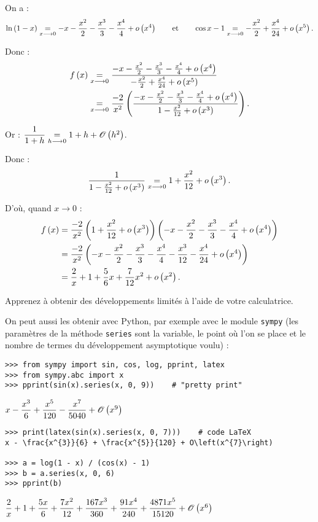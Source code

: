 \begin{corr}
On a : \[\ln\left(1-x\right)\underset{x\longrightarrow0}{=}-x-\dfrac{x^2}{2}-\dfrac{x^3}{3}-\dfrac{x^4}{4}+o\left(x^4\right)\qquad\text{et}\qquad\cos x-1\underset{x\longrightarrow0}{=}-\dfrac{x^2}{2}+\dfrac{x^4}{24}+o\left(x^5\right).\]

Donc : \[\begin{aligned}
f\left(x\right)&\underset{x\longrightarrow0}{=}\dfrac{-x-\frac{x^2}{2}-\frac{x^3}{3}-\frac{x^4}{4}+o\left(x^4\right)}{-\frac{x^2}{2}+\frac{x^4}{24}+o\left(x^5\right)} \\
&\underset{x\longrightarrow0}{=}\dfrac{-2}{x^2}\left(\dfrac{-x-\frac{x^2}{2}-\frac{x^3}{3}-\frac{x^4}{4}+o\left(x^4\right)}{1-\frac{x^2}{12}+o\left(x^3\right)}\right).
\end{aligned}\]

Or : \(\dfrac{1}{1+h}\underset{h\longrightarrow0}{=}1+h+\mathscr{O}\left(h^2\right)\).

Donc : \[\dfrac{1}{1-\frac{x^2}{12}+o\left(x^3\right)}\underset{x\longrightarrow0}{=}1+\dfrac{x^2}{12}+o\left(x^3\right).\]

D'où, quand \(x\to0\) : \[\begin{aligned}
f\left(x\right)&=\dfrac{-2}{x^2}\left(1+\dfrac{x^2}{12}+o\left(x^3\right)\right)\left(-x-\dfrac{x^2}{2}-\dfrac{x^3}{3}-\dfrac{x^4}{4}+o\left(x^4\right)\right) \\
&=\dfrac{-2}{x^2}\left(-x-\dfrac{x^2}{2}-\dfrac{x^3}{3}-\dfrac{x^4}{4}-\dfrac{x^3}{12}-\dfrac{x^4}{24}+o\left(x^4\right)\right) \\
&=\dfrac{2}{x}+1+\dfrac{5}{6}x+\dfrac{7}{12}x^2+o\left(x^2\right).
\end{aligned}\]
\end{corr}

\begin{rem}
Apprenez à obtenir des développements limités à l'aide de votre calculatrice.

On peut aussi les obtenir avec Python, par exemple avec le module \verb|sympy| (les paramètres de la méthode \verb|series| sont la variable, le point où l'on se place et le nombre de termes du développement asymptotique voulu) :

\begin{verbatim}
>>> from sympy import sin, cos, log, pprint, latex
>>> from sympy.abc import x
>>> pprint(sin(x).series(x, 0, 9))    # "pretty print"
\end{verbatim}

\(x-\dfrac{x^3}{6}+\dfrac{x^5}{120}-\dfrac{x^7}{5040}+\mathscr{O}\left(x^9\right)\)

\begin{verbatim}
>>> print(latex(sin(x).series(x, 0, 7)))    # code LaTeX
x - \frac{x^{3}}{6} + \frac{x^{5}}{120} + O\left(x^{7}\right)

>>> a = log(1 - x) / (cos(x) - 1)
>>> b = a.series(x, 0, 6)
>>> pprint(b)
\end{verbatim}

\(\dfrac{2}{x}+1+\dfrac{5x}{6}+\dfrac{7x^2}{12}+\dfrac{167x^3}{360}+\dfrac{91x^4}{240}+\dfrac{4871x^5}{15120}+\mathscr{O}\left(x^6\right)\)
\end{rem}

